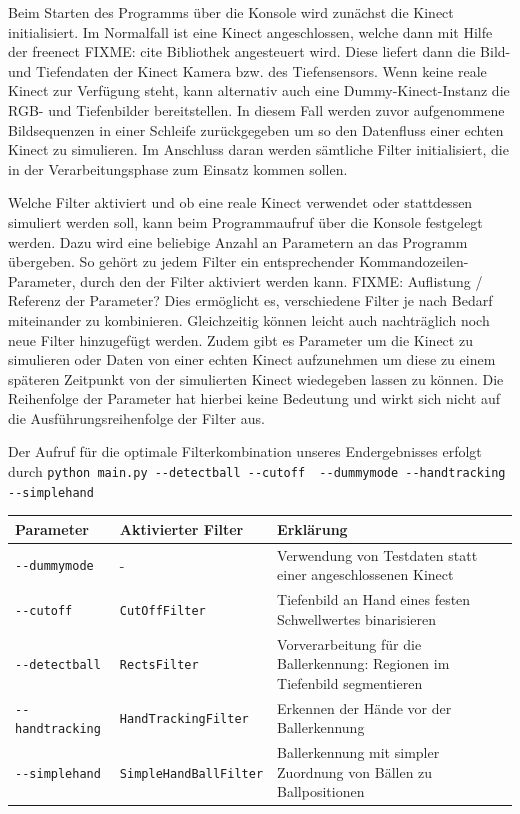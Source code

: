 \documentclass[12pt,a4paper,ngerman]{scrartcl}
\begin{document}
Beim Starten des Programms über die Konsole wird zunächst die Kinect initialisiert.
Im Normalfall ist eine Kinect angeschlossen, welche dann mit Hilfe der freenect {\color{red}FIXME: cite} Bibliothek angesteuert wird. Diese liefert dann die Bild- und Tiefendaten der Kinect Kamera bzw. des Tiefensensors. Wenn keine reale Kinect zur Verfügung steht, kann alternativ auch eine Dummy-Kinect-Instanz die RGB- und Tiefenbilder bereitstellen. In diesem Fall werden zuvor aufgenommene Bildsequenzen in einer Schleife zurückgegeben um so den Datenfluss einer echten Kinect zu simulieren.
Im Anschluss daran werden sämtliche Filter initialisiert, die in der Verarbeitungsphase zum Einsatz kommen sollen.

Welche Filter aktiviert und ob eine reale Kinect verwendet oder stattdessen simuliert werden soll, kann beim Programmaufruf über die Konsole festgelegt werden. Dazu wird eine beliebige Anzahl an Parametern an das Programm übergeben. So gehört zu jedem Filter ein entsprechender Kommandozeilen-Parameter, durch den der Filter aktiviert werden kann. {\color{red}FIXME: Auflistung / Referenz der Parameter?} Dies ermöglicht es, verschiedene Filter je nach Bedarf miteinander zu kombinieren. Gleichzeitig können leicht auch nachträglich noch neue Filter hinzugefügt werden. Zudem gibt es Parameter um die Kinect zu simulieren oder Daten von einer echten Kinect aufzunehmen um diese zu einem späteren Zeitpunkt von der simulierten Kinect wiedegeben lassen zu können. Die Reihenfolge der Parameter hat hierbei keine Bedeutung und wirkt sich nicht auf die Ausführungsreihenfolge der Filter aus.

Der Aufruf für die optimale Filterkombination unseres Endergebnisses erfolgt durch \lstinline{python main.py --detectball --cutoff  --dummymode --handtracking --simplehand}

\begin{tabular}{llp{8cm}}
Parameter & Aktivierter Filter & Erklärung \\ \hline
{\lstinline!--dummymode!} & - & Verwendung von Testdaten statt einer angeschlossenen Kinect \\
{\lstinline!--cutoff!} & {\lstinline!CutOffFilter!} & Tiefenbild an Hand eines festen Schwellwertes binarisieren \\
{\lstinline!--detectball!} & {\lstinline!RectsFilter!} & Vorverarbeitung für die Ballerkennung: Regionen im Tiefenbild segmentieren \\
{\lstinline!--handtracking!} & {\lstinline!HandTrackingFilter!} & Erkennen der Hände vor der Ballerkennung \\
{\lstinline!--simplehand!} & {\lstinline!SimpleHandBallFilter!} & Ballerkennung mit simpler Zuordnung von Bällen zu Ballpositionen
\end{tabular}
\end{document}
